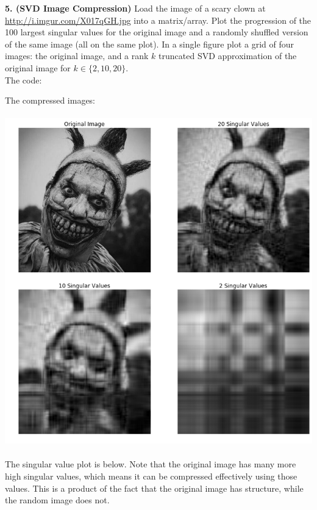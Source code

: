 \documentclass[12pt,letterpaper,fleqn]{hmcpset}
\begin{document}
\newpage

\textbf{5. (SVD Image Compression)} Load the image of a scary clown at \url{http://i.imgur.com/X017qGH.jpg}
into a matrix/array. Plot the progression of the 100 largest singular values for the original image
and a randomly shuffled version of the same image (all on the same plot). In a single figure plot
a grid of four images: the original image, and a rank $k$ truncated SVD approximation of the original
image for $k\in\{2,10,20\}$.\\[1em]

The code:

The compressed images:\\\\
\includegraphics[scale = .5]{p5comp.png}\\\\
The singular value plot is below. Note that the original image has many more high singular values, which means it can be compressed effectively using those values. This is a product of the fact that the original image has structure, while the random image does not.\\\\
\end{document}
